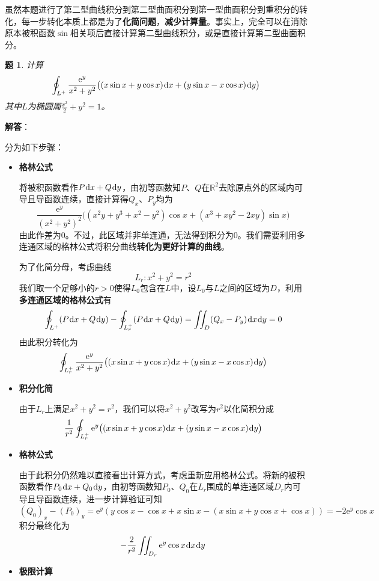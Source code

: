 \documentclass[a4paper,UTF8,fontset=windows,AutoFakeBold]{ctexart}
\newcommand*{\dr}{\hspace{0.07em}\mathrm{d}}
\newcommand*{\er}{\mathrm{e}}
\newcommand*{\rb}{\mathbb{R}}
\newcommand*{\note}{\noindent *}
\theoremstyle{ex}
\newtheorem{exercise}{题}
\newcommand{\sol}[1]{{\vspace{5pt}\kaishu\noindent\textbf{解答}：\vspace{-3pt}
\begin{compactitem}
    \item[] #1
\end{compactitem}
}}
\begin{document}
\note 虽然本题进行了第二型曲线积分到第二型曲面积分到第一型曲面积分到重积分的转化，每一步转化本质上都是为了\textbf{化简问题}，\textbf{减少计算量}。事实上，完全可以在消除原本被积函数$\sin$相关项后直接计算第二型曲线积分，或是直接计算第二型曲面积分。

\begin{framed}
\begin{exercise}
    计算
    $$\oint_{L^+}\frac{\er^y}{x^2+y^2}\big((x\sin x+y\cos x)\dr x+(y\sin x-x\cos x)\dr y\big)$$
    其中$L$为椭圆周$\frac{x^2}{2}+y^2=1$。
\end{exercise}
\sol{
    分为如下步骤：
    \begin{itemize}
        \item \textbf{格林公式}
        
        将被积函数看作$P\dr x+Q\dr y$，由初等函数知$P$、$Q$在$\rb^2$去除原点外的区域内可导且导函数连续，直接计算得$Q_x$、$P_y$均为
        $$\frac{\er^y}{(x^2+y^2)^2}\big((x^2y+y^3+x^2-y^2)\cos x+(x^3+xy^2-2xy)\sin x\big)$$
        由此作差为0。不过，此区域并非单连通，无法得到积分为0。我们需要利用多连通区域的格林公式将积分曲线\textbf{转化为更好计算的曲线}。

        为了化简分母，考虑曲线
        $$L_r\colon x^2+y^2=r^2$$
        我们取一个足够小的$r>0$使得$L_0$包含在$L$中，设$L_0$与$L$之间的区域为$D$，利用\textbf{多连通区域的格林公式}有
        $$\oint_{L^+}(P\dr x+Q\dr y)-\oint_{L_r^+}(P\dr x+Q\dr y)=\iint_D(Q_x-P_y)\dr x\dr y=0$$
        由此积分转化为
        $$\oint_{L_r^+}\frac{\er^y}{x^2+y^2}\big((x\sin x+y\cos x)\dr x+(y\sin x-x\cos x)\dr y\big)$$

        \item \textbf{积分化简}
        
        由于$L_r$上满足$x^2+y^2=r^2$，我们可以将$x^2+y^2$改写为$r^2$以化简积分成
        $$\frac{1}{r^2}\oint_{L_r^+}\er^y\big((x\sin x+y\cos x)\dr x+(y\sin x-x\cos x)\dr y\big)$$

        \item \textbf{格林公式}
        
        由于此积分仍然难以直接看出计算方式，考虑重新应用格林公式。将新的被积函数看作$P_0\dr x+Q_0\dr y$，由初等函数知$P_0$、$Q_0$在$L_r$围成的单连通区域$D_r$内可导且导函数连续，进一步计算验证可知
        $$(Q_0)_x-(P_0)_y=\er^y(y\cos x-\cos x+x\sin x-(x\sin x+y\cos x+\cos x))=-2\er^y\cos x$$
        积分最终化为
        $$-\frac{2}{r^2}\iint_{D_r}\er^y\cos x\dr x\dr y$$

        \item \textbf{极限计算}
        

\end{itemize}}
\end{framed}
\end{document}
